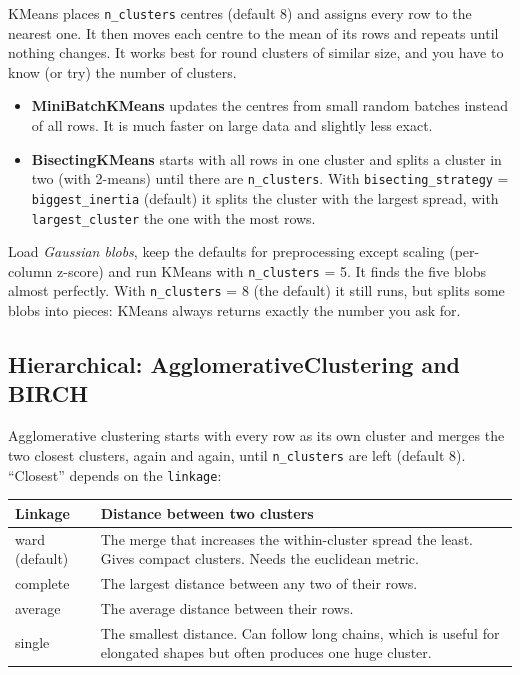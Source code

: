 \documentclass[11pt,a4paper]{article}
\newcommand{\param}[1]{\texttt{#1}}         %
\begin{document}
KMeans places \param{n\_clusters} centres (default 8) and assigns every row to the nearest one. It then moves each
centre to the mean of its rows and repeats until nothing changes. It works best for round clusters of similar size,
and you have to know (or try) the number of clusters.

\begin{itemize}
  \item \textbf{MiniBatchKMeans} updates the centres from small random batches instead of all rows. It is much
    faster on large data and slightly less exact.
  \item \textbf{BisectingKMeans} starts with all rows in one cluster and splits a cluster in two (with 2-means)
    until there are \param{n\_clusters}. With \param{bisecting\_strategy} = \texttt{biggest\_inertia} (default) it
    splits the cluster with the largest spread, with \texttt{largest\_cluster} the one with the most rows.
\end{itemize}

\begin{example}
Load \emph{Gaussian blobs}, keep the defaults for preprocessing except scaling (per-column z-score) and run KMeans
with \param{n\_clusters} = 5. It finds the five blobs almost perfectly. With \param{n\_clusters} = 8 (the default)
it still runs, but splits some blobs into pieces: KMeans always returns exactly the number you ask for.
\end{example}

\subsection{Hierarchical: AgglomerativeClustering and BIRCH}

Agglomerative clustering starts with every row as its own cluster and merges the two closest clusters, again and
again, until \param{n\_clusters} are left (default 8). ``Closest'' depends on the \param{linkage}:

\begin{center}
\begin{tabularx}{\textwidth}{lL}
\toprule
Linkage & Distance between two clusters\\
\midrule
ward (default) & The merge that increases the within-cluster spread the least. Gives compact clusters. Needs the
  euclidean metric.\\
complete & The largest distance between any two of their rows.\\
average & The average distance between their rows.\\
single & The smallest distance. Can follow long chains, which is useful for elongated shapes but often produces one
  huge cluster.\\
\bottomrule
\end{tabularx}
\end{center}
\end{document}
